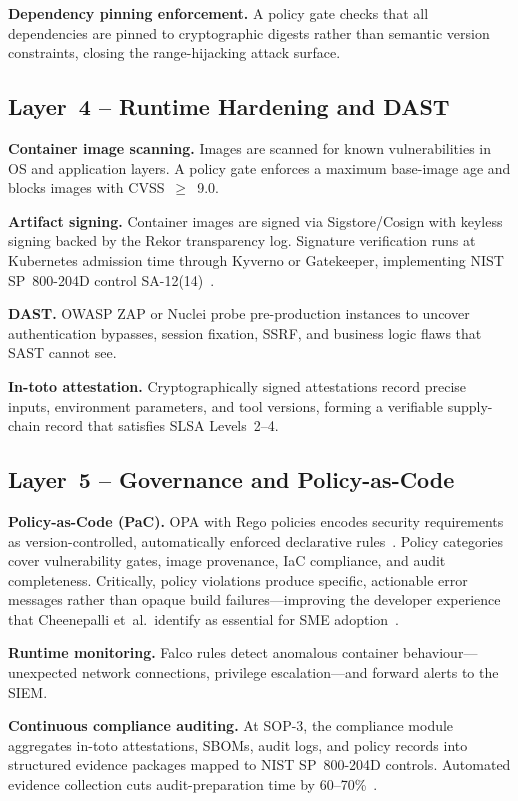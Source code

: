 \documentclass[letterpaper, 10pt, conference]{ieeeconf}
\begin{document}
\textbf{Dependency pinning enforcement.} A policy gate checks that all
dependencies are pinned to cryptographic digests rather than semantic
version constraints, closing the range-hijacking attack surface.

\subsection{Layer~4 -- Runtime Hardening and DAST}

\textbf{Container image scanning.} Images are scanned for known
vulnerabilities in OS and application layers. A policy gate enforces a
maximum base-image age and blocks images with CVSS~$\geq$~9.0.

\textbf{Artifact signing.} Container images are signed via
Sigstore/Cosign with keyless signing backed by the Rekor transparency
log. Signature verification runs at Kubernetes admission time through
Kyverno or Gatekeeper, implementing NIST SP~800-204D control
SA-12(14)~\cite{nist2024}.

\textbf{DAST.} OWASP ZAP or Nuclei probe pre-production instances to
uncover authentication bypasses, session fixation, SSRF, and business
logic flaws that SAST cannot see.

\textbf{In-toto attestation.} Cryptographically signed attestations
record precise inputs, environment parameters, and tool versions, forming
a verifiable supply-chain record that satisfies SLSA Levels~2--4.

\subsection{Layer~5 -- Governance and Policy-as-Code}

\textbf{Policy-as-Code (PaC).} OPA with Rego policies encodes security
requirements as version-controlled, automatically enforced declarative
rules~\cite{solanke2022,allam2022,thota2024}. Policy categories cover
vulnerability gates, image provenance, IaC compliance, and audit
completeness. Critically, policy violations produce specific, actionable
error messages rather than opaque build failures---improving the developer
experience that Cheenepalli et~al.\ identify as essential for SME
adoption~\cite{cheenepalli2025}.

\textbf{Runtime monitoring.} Falco rules detect anomalous container
behaviour---unexpected network connections, privilege escalation---and
forward alerts to the SIEM.

\textbf{Continuous compliance auditing.} At SOP-3, the compliance module
aggregates in-toto attestations, SBOMs, audit logs, and policy records
into structured evidence packages mapped to NIST SP~800-204D controls.
Automated evidence collection cuts audit-preparation time by
60--70\%~\cite{solanke2022}.
\end{document}
